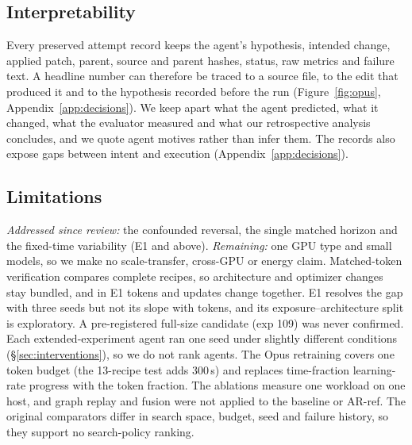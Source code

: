 \documentclass{article}
\newif\ifshowhumanmarkers \showhumanmarkersfalse
\newcommand{\humantag}[1]{{\color{humanframe}\sffamily\scriptsize\bfseries HUMAN AUTHOR MUST REWRITE/VERIFY [#1]}\ }
\newcommand{\humanauthor}[2][]{\ifshowhumanmarkers\begin{humanbox}\humantag{#1}#2\end{humanbox}\else #2\par\fi}
\begin{document}
\subsection{Interpretability}
\humanauthor[P2-13 r6]{ Every preserved attempt record keeps the agent's hypothesis, intended change, applied patch, parent, source and parent hashes, status, raw metrics and failure text. A headline number can therefore be traced to a source file, to the edit that produced it and to the hypothesis recorded before the run (Figure~\ref{fig:opus}, Appendix~\ref{app:decisions}). We keep apart what the agent predicted, what it changed, what the evaluator measured and what our retrospective analysis concludes, and we quote agent motives rather than infer them. The records also expose gaps between intent and execution (Appendix~\ref{app:decisions}).}

\subsection{Limitations}
\humanauthor[P2-14 r6]{ \emph{Addressed since review:} the confounded reversal, the single matched horizon and the fixed-time variability (E1 and above). \emph{Remaining:} one GPU type and small models, so we make no scale-transfer, cross-GPU or energy claim. Matched-token verification compares complete recipes, so architecture and optimizer changes stay bundled, and in E1 tokens and updates change together. E1 resolves the gap with three seeds but not its slope with tokens, and its exposure--architecture split is exploratory. A pre-registered full-size candidate (exp 109) was never confirmed. Each extended-experiment agent ran one seed under slightly different conditions (\S\ref{sec:interventions}), so we do not rank agents. The Opus retraining covers one token budget (the 13-recipe test adds 300\,s) and replaces time-fraction learning-rate progress with the token fraction. The ablations measure one workload on one host, and graph replay and fusion were not applied to the baseline or AR-ref. The original comparators differ in search space, budget, seed and failure history, so they support no search-policy ranking.}
\end{document}
